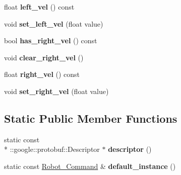 \begin{DoxyCompactItemize}
\item 
\hypertarget{classvss__command_1_1Robot__Command_a179ef683cadb10827e8112f2f1e174a5}{float {\bfseries left\-\_\-vel} () const }\label{classvss__command_1_1Robot__Command_a179ef683cadb10827e8112f2f1e174a5}

\item 
\hypertarget{classvss__command_1_1Robot__Command_a2792ed641e6a25348fab7d26d989f670}{void {\bfseries set\-\_\-left\-\_\-vel} (float value)}\label{classvss__command_1_1Robot__Command_a2792ed641e6a25348fab7d26d989f670}

\item 
\hypertarget{classvss__command_1_1Robot__Command_af192678ad6c73ff034b042275511d503}{bool {\bfseries has\-\_\-right\-\_\-vel} () const }\label{classvss__command_1_1Robot__Command_af192678ad6c73ff034b042275511d503}

\item 
\hypertarget{classvss__command_1_1Robot__Command_acdb3ec06b0b7183f192df01af72e70aa}{void {\bfseries clear\-\_\-right\-\_\-vel} ()}\label{classvss__command_1_1Robot__Command_acdb3ec06b0b7183f192df01af72e70aa}

\item 
\hypertarget{classvss__command_1_1Robot__Command_ad8e37a453b8729183b59a2bade49cc74}{float {\bfseries right\-\_\-vel} () const }\label{classvss__command_1_1Robot__Command_ad8e37a453b8729183b59a2bade49cc74}

\item 
\hypertarget{classvss__command_1_1Robot__Command_a6e63f0df3268bde40f11d47ea167ceb3}{void {\bfseries set\-\_\-right\-\_\-vel} (float value)}\label{classvss__command_1_1Robot__Command_a6e63f0df3268bde40f11d47ea167ceb3}

\end{DoxyCompactItemize}
\subsection*{Static Public Member Functions}
\begin{DoxyCompactItemize}
\item 
\hypertarget{classvss__command_1_1Robot__Command_ad40c6b295898b078ff34e9966d89b6e5}{static const \\*
\-::google\-::protobuf\-::\-Descriptor $\ast$ {\bfseries descriptor} ()}\label{classvss__command_1_1Robot__Command_ad40c6b295898b078ff34e9966d89b6e5}

\item 
\hypertarget{classvss__command_1_1Robot__Command_a4c818a68a4bee11acbc7e7b5483ff4d7}{static const \hyperlink{classvss__command_1_1Robot__Command}{Robot\-\_\-\-Command} \& {\bfseries default\-\_\-instance} ()}\label{classvss__command_1_1Robot__Command_a4c818a68a4bee11acbc7e7b5483ff4d7}

\end{DoxyCompactItemize}

